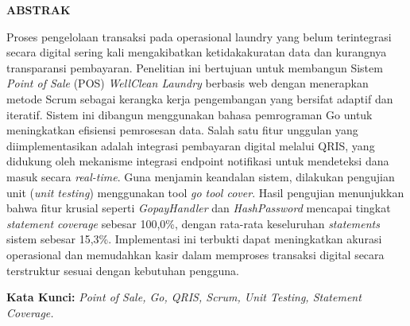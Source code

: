 \begin{center}
    {\fontsize{14}{16}\selectfont\bfseries ABSTRAK}
\end{center}

\vspace{0.5cm}

\begin{singlespace}
\noindent
Proses pengelolaan transaksi pada operasional laundry yang belum terintegrasi secara digital sering kali mengakibatkan ketidakakuratan data dan kurangnya transparansi pembayaran. Penelitian ini bertujuan untuk membangun Sistem \textit{Point of Sale} (POS) \textit{WellClean Laundry} berbasis web dengan menerapkan metode Scrum sebagai kerangka kerja pengembangan yang bersifat adaptif dan iteratif. Sistem ini dibangun menggunakan bahasa pemrograman Go untuk meningkatkan efisiensi pemrosesan data. Salah satu fitur unggulan yang diimplementasikan adalah integrasi pembayaran digital melalui QRIS, yang didukung oleh mekanisme integrasi endpoint notifikasi untuk mendeteksi dana masuk secara \textit{real-time}. Guna menjamin keandalan sistem, dilakukan pengujian unit (\textit{unit testing}) menggunakan tool \textit{go tool cover}. Hasil pengujian menunjukkan bahwa fitur krusial seperti \textit{GopayHandler} dan \textit{HashPassword} mencapai tingkat \textit{statement coverage} sebesar 100,0\%, dengan rata-rata keseluruhan \textit{statements} sistem sebesar 15,3\%. Implementasi ini terbukti dapat meningkatkan akurasi operasional dan memudahkan kasir dalam memproses transaksi digital secara terstruktur sesuai dengan kebutuhan pengguna.

\vspace{0.8cm} %

\noindent
\textbf{Kata Kunci:} \textit{Point of Sale, Go, QRIS, Scrum, Unit Testing, Statement Coverage.}
\end{singlespace}